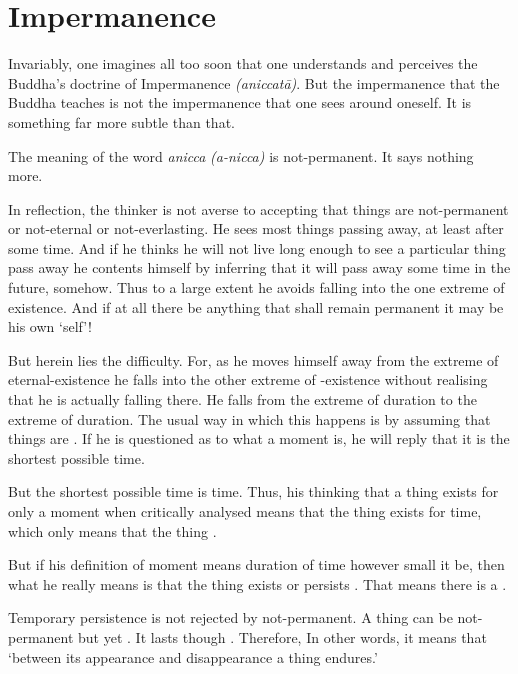 \chapter{Impermanence}

Invariably, one imagines all too soon that one understands and perceives the Buddha's doctrine of Impermanence \emph{(aniccatā)}. But the impermanence that the Buddha teaches is not the impermanence that one sees around oneself. It is something far more subtle than that.

The meaning of the word \emph{anicca} \emph{(a-nicca)} is not-permanent. It says nothing more.

In reflection, the thinker is not averse to accepting that things are not-permanent or not-eternal or not-everlasting. He sees most things passing away, at least after some time. And if he thinks he will not live long enough to see a particular thing pass away he contents himself by inferring that it will pass away some time in the future, somehow. Thus to a large extent he avoids falling into the one extreme of  existence. And if at all there be anything that shall remain permanent it may be his own `self'!

But herein lies the difficulty. For, as he moves himself away from the extreme of eternal-existence he falls into the other extreme of -existence without realising that he is actually falling there. He falls from the extreme of  duration to the extreme of  duration. The usual way in which this happens is by assuming that things are . If he is questioned as to what a moment is, he will reply that it is the shortest possible time.

But the shortest possible time is  time. Thus, his thinking that a thing exists for only a moment when critically analysed means that the thing exists for  time, which only means that the thing .

But if his definition of moment means  duration of time however small it be, then what he really means is that the thing exists or persists . That means there is a .

Temporary persistence is not rejected by not-permanent. A thing can be not-permanent but yet . It lasts  though . Therefore,  In other words, it means that `between its appearance and disappearance a thing endures.'

